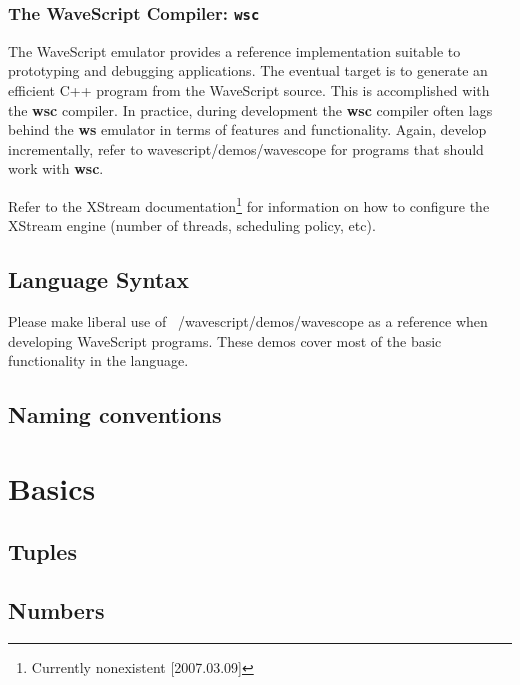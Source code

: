 \subsection{The WaveScript Compiler: {\tt \bf wsc}}

The WaveScript emulator provides a reference implementation suitable
to prototyping and debugging applications.  The eventual target is to
generate an efficient C++ program from the WaveScript source.  This is
accomplished with the {\bf wsc} compiler.  In practice, during
development the {\bf wsc} compiler often lags behind the {\bf ws}
emulator in terms of features and functionality.  Again, develop
incrementally, refer to wavescript/demos/wavescope for programs that
should work with {\bf wsc}.

Refer to the XStream documentation\footnote{Currently nonexistent
[2007.03.09]} for information on how to configure the XStream engine
(number of threads, scheduling policy, etc).


\section{Language Syntax}

Please make liberal use of ~/wavescript/demos/wavescope as a reference
when developing WaveScript programs.  These demos cover most of the
basic functionality in the language.

\section{Naming conventions}

\chapter{Basics}

\section{Tuples}

\section{Numbers}

